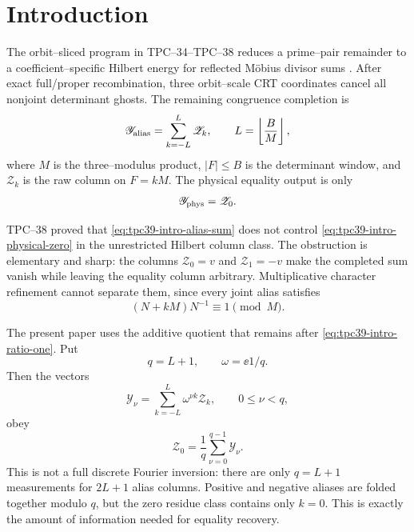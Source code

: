 \section{Introduction}
\label{sec:tpc39-introduction}

The orbit--sliced program in TPC--34--TPC--38 reduces a prime--pair
remainder to a coefficient--specific Hilbert energy for reflected
M\"obius divisor sums
\citep{WangTPC34,WangTPC35,WangTPC36,WangTPC37,WangTPC38}.
After exact full/proper recombination, three orbit--scale CRT coordinates
cancel all nonjoint determinant ghosts.  The remaining
congruence completion is
\begin{equation}
 \mathscr Y_{\rm alias}
 =\sum_{k=-L}^{L}\mathscr Z_k,
 \qquad
 L=\left\lfloor\frac BM\right\rfloor,
 \label{eq:tpc39-intro-alias-sum}
\end{equation}
where \(M\) is the three--modulus product, \(|F|\le B\) is the
determinant window, and \(\mathscr Z_k\) is the raw column on
\(F=kM\).  The physical equality output is only
\begin{equation}
 \mathscr Y_{\rm phys}=\mathscr Z_0.
 \label{eq:tpc39-intro-physical-zero}
\end{equation}

TPC--38 proved that \eqref{eq:tpc39-intro-alias-sum} does not control
\eqref{eq:tpc39-intro-physical-zero} in the unrestricted Hilbert column
class.  The obstruction is elementary and sharp: the columns
\(\mathscr Z_0=v\) and \(\mathscr Z_1=-v\) make the completed sum vanish
while leaving the equality column arbitrary.  Multiplicative character
refinement cannot separate them, since every joint alias satisfies
\begin{equation}
 (N+kM)N^{-1}\equiv1\pmod M.
 \label{eq:tpc39-intro-ratio-one}
\end{equation}

The present paper uses the additive quotient that remains after
\eqref{eq:tpc39-intro-ratio-one}.  Put
\begin{equation}
 q=L+1,
 \qquad \omega=\ee{1/q}.
 \label{eq:tpc39-intro-minimal-q}
\end{equation}
Then the vectors
\begin{equation}
 \mathscr Y_\nu
 =\sum_{k=-L}^{L}\omega^{\nu k}\mathscr Z_k,
 \qquad 0\le\nu<q,
 \label{eq:tpc39-intro-twisted-bank}
\end{equation}
obey
\begin{equation}
 \boxed{
 \mathscr Z_0=\frac1q\sum_{\nu=0}^{q-1}\mathscr Y_\nu.}
 \label{eq:tpc39-intro-exact-recovery}
\end{equation}
This is not a full discrete Fourier inversion: there are only \(q=L+1\)
measurements for \(2L+1\) alias columns.  Positive and negative aliases
are folded together modulo \(q\), but the zero residue class contains
only \(k=0\).  This is exactly the amount of information needed for
equality recovery.

